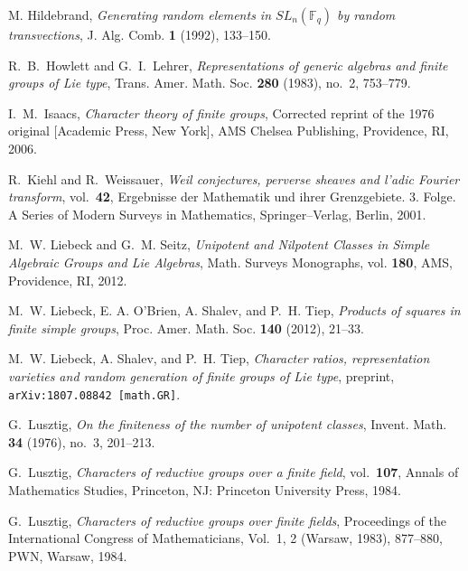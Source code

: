 \documentclass[eqthmnum,nocolour,skinny]{jt-calcs}
\begin{document}
\begin{thebibliography}{99}
{\sc M. Hildebrand}, \emph{Generating random elements in $SL_n(\mathbb{F}_q)$ by random transvections}, J. Alg. Comb. {\bf 1} (1992), 133--150.

{\sc R.~B.~Howlett and G.~I.~Lehrer}, \emph{Representations of generic algebras and finite groups of Lie type}, Trans. Amer. Math. Soc. {\bf 280} (1983), no.~2, 753--779.

{\sc I.~M.~Isaacs}, \emph{Character theory of finite groups}, Corrected reprint of the 1976 original [Academic Press, New York], AMS Chelsea Publishing, Providence, RI, 2006.

{\sc R.~Kiehl and R.~Weissauer}, \emph{Weil conjectures, perverse sheaves and l'adic Fourier transform}, vol.~{\bf 42}, Ergebnisse der Mathematik und ihrer Grenzgebiete. 3. Folge. A Series of Modern Surveys in Mathematics, Springer--Verlag, Berlin, 2001.

{\sc M.~W. Liebeck and G.~M. Seitz}, {\em Unipotent and Nilpotent Classes in Simple Algebraic Groups and Lie Algebras}, Math. Surveys Monographs, vol. {\bf 180}, AMS, Providence, RI, 2012.

{\sc M.~W. Liebeck, E. A. O'Brien, A. Shalev, and P.~H. Tiep}, {\it Products of squares in finite simple groups}, Proc. Amer. Math. Soc. 
{\bf 140} (2012), 21--33. 

{\sc M.~W. Liebeck, A. Shalev, and P.~H. Tiep}, 
{\it Character ratios, representation varieties and random generation of finite groups of Lie type}, preprint, \texttt{arXiv:1807.08842 [math.GR]}.

{\sc G.~Lusztig}, \emph{On the finiteness of the number of unipotent classes}, Invent. Math. {\bf 34} (1976), no.~3, 201--213.

{\sc G.~Lusztig}, \emph{Characters of reductive groups over a finite field}, vol.~{\bf 107}, Annals of Mathematics Studies, Princeton, NJ: Princeton University Press, 1984.

{\sc G.~Lusztig}, \emph{Characters of reductive groups over finite fields}, Proceedings of the {I}nternational {C}ongress of {M}athematicians, {V}ol.\ 1, 2 ({W}arsaw, 1983), 877--880, PWN, Warsaw, 1984.


\end{thebibliography}
\end{document}
